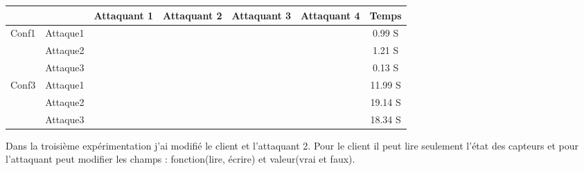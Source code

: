 \documentclass[10pt,a4paper]{article}
\newcommand{\cmark}{\ding{51}}%
\newcommand{\xmark}{\ding{55}}%
\begin{document}
\small
\begin{tabular}{ll|c|c|c|c|c|}
\cline{3-7}
&  &  Attaquant 1 &  Attaquant 2 &  Attaquant 3 & Attaquant 4 & Temps  \\ \hline
\multicolumn{1}{|l|}{\multirow{3}{*}{Conf1}} & Attaque1 &  \color{green}{\cmark} & \color{green}{\cmark} & \color{green}{\cmark} & \color{red}{\xmark}  & 0.99 S  \\ \cline{2-7} 
\multicolumn{1}{|l|}{}& Attaque2 & \color{green}{\cmark} & \color{green}{\cmark} & \color{green}{\cmark} & \color{red}{\xmark} & 1.21 S  \\ \cline{2-7} 
\multicolumn{1}{|l|}{}& Attaque3 & \color{green}{\cmark} & \color{green}{\cmark} & \color{green}{\cmark} & \color{red}{\xmark} & 0.13 S  \\ \hline
\multicolumn{1}{|l|}{\multirow{3}{*}{Conf3}} & Attaque1 & \color{green}{\cmark} & \color{green}{\cmark} & \color{red}{\xmark} & \color{red}{\xmark} &  11.99 S\\ \cline{2-7} 
\multicolumn{1}{|l|}{}& Attaque2 & \color{green}{\cmark} & \color{green}{\cmark} & \color{red}{\xmark} & \color{red}{\xmark} & 19.14 S  \\ \cline{2-7} 
\multicolumn{1}{|l|}{}& Attaque3 & \color{green}{\cmark} & \color{green}{\cmark} & \color{red}{\xmark} & \color{red}{\xmark} & 18.34  S \\ \hline
\end{tabular}
\medskip

Dans la troisième expérimentation j’ai modifié le client et l’attaquant 2. Pour le client il peut lire seulement l’état des capteurs et pour l’attaquant peut modifier les champs : fonction(lire, écrire) et valeur(vrai et faux).\newline 
\end{document}
